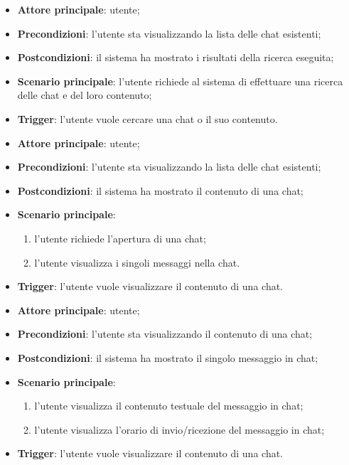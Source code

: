 \documentclass[10pt, a4paper]{article}
\begin{document}
    \begin{itemize}
        \item \textbf{Attore principale}: utente;
        \item \textbf{Precondizioni}: l’utente sta visualizzando la lista delle chat esistenti;
        \item \textbf{Postcondizioni}: il sistema ha mostrato i risultati della ricerca eseguita;
        \item \textbf{Scenario principale}: l’utente richiede al sistema di effettuare una ricerca delle chat e del loro contenuto;
        \item \textbf{Trigger}: l’utente vuole cercare una chat o il suo contenuto.
    \end{itemize}

    \begin{itemize}
        \item \textbf{Attore principale}: utente;
        \item \textbf{Precondizioni}: l’utente sta visualizzando la lista delle chat esistenti;
        \item \textbf{Postcondizioni}: il sistema ha mostrato il contenuto di una chat;
        \item \textbf{Scenario principale}:
            \begin{enumerate}
                \item l’utente richiede l’apertura di una chat;
                \item l'utente visualizza i singoli messaggi nella chat.
            \end{enumerate}
        \item \textbf{Trigger}: l’utente vuole visualizzare il contenuto di una chat.
    \end{itemize}

    \begin{itemize}
        \item \textbf{Attore principale}: utente;
        \item \textbf{Precondizioni}: l’utente sta visualizzando il contenuto di una chat;
        \item \textbf{Postcondizioni}: il sistema ha mostrato il singolo messaggio in chat;
        \item \textbf{Scenario principale}:
            \begin{enumerate}
                \item l’utente visualizza il contenuto testuale del messaggio in chat;
                \item l’utente visualizza l'orario di invio/ricezione del messaggio in chat;
            \end{enumerate}
        \item \textbf{Trigger}: l’utente vuole visualizzare il contenuto di una chat.
    \end{itemize}
\end{document}
